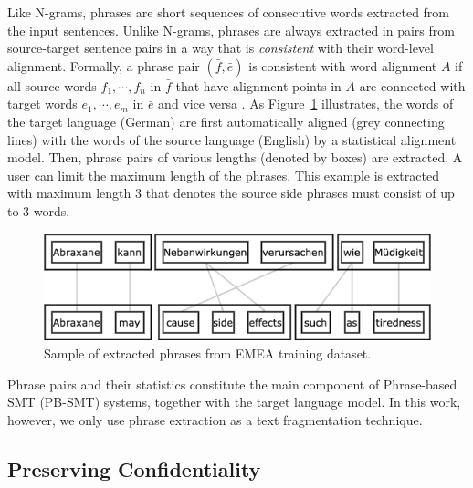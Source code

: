 Like N-grams, phrases are short sequences of consecutive words extracted from the input sentences. Unlike N-grams, phrases are always extracted in pairs from source-target sentence pairs in a way that is \textit{consistent} with their word-level alignment. Formally, a phrase pair $(\bar{f}, \bar{e})$ is consistent with word alignment $A$ if all source words $f_1, \cdots, f_n$ in $\bar{f}$ that have alignment points in $A$ are connected with target words $e_1, \cdots, e_m$ in $\bar{e}$ and vice versa \parencite{koehn2003statistical, koehn_2009}. 
As Figure~\ref{fig:example_phrase} illustrates, the words of the target language (German) are first automatically aligned (grey connecting lines) with the words of the source language (English) by a statistical alignment model. Then, phrase pairs of various lengths (denoted by boxes) are extracted. A user can limit the maximum length of the phrases. This example is extracted with maximum length 3 that denotes the source side phrases must consist of up to 3 words. 

\begin{figure}[hb!]
    \centering
    \includegraphics[scale=0.63]{images/phrase_example.png}
    \caption{Sample of extracted phrases from EMEA training dataset.}
    \label{fig:example_phrase}
\end{figure}

Phrase pairs and their statistics constitute the main component of Phrase-based SMT (PB-SMT) systems, together with the target language model.
In this work, however, we only use phrase extraction as a text fragmentation technique.

\subsection{Preserving Confidentiality}

